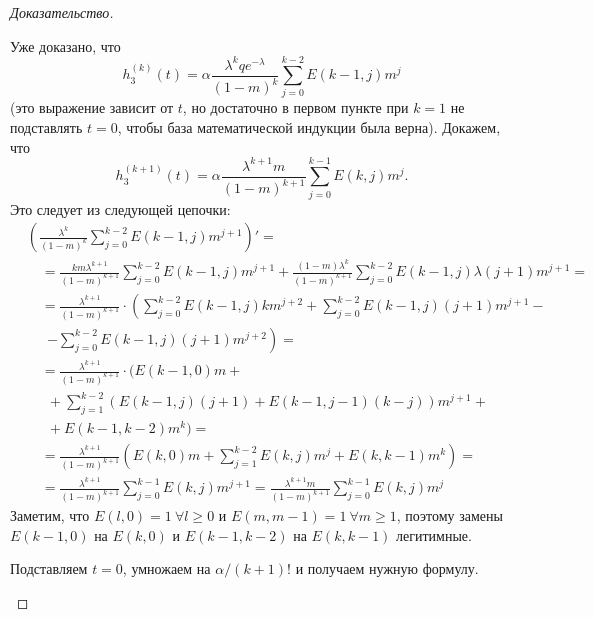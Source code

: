 \documentclass[12pt, specialist, subf, substylefile = spbu_report.rtx]{disser}
\begin{document}
\begin{proof}[Доказательство]
\begin{enumerate}
			Уже доказано, что
			\[
			h _3 ^{(k)} (t) = \alpha \frac {\lambda ^k q e ^{-\lambda}} {(1 - m) ^k} \sum \limits _{j = 0} ^{k - 2} E(k - 1, j) m ^j
			\]
			(это выражение зависит от $t$, но достаточно в первом пункте при $k = 1$ не подставлять $t = 0$, чтобы база математической индукции была верна). Докажем, что
			\[
			h _3 ^{(k + 1)} (t) = \alpha \frac {\lambda ^{k + 1} m} {(1 - m) ^{k + 1}} \sum \limits _{j = 0} ^{k - 1} E(k, j) m ^j.
			\]
			Это следует из следующей цепочки:
			\[
				\begin{aligned}
					&\left(\frac {\lambda ^k} {(1 - m) ^k} \sum \limits _{j = 0} ^{k - 2} E(k - 1, j) m ^{j + 1}\right)' =\\
					&\quad = \frac {km\lambda ^{k + 1}} {(1 - m) ^{k + 1}} \sum \limits _{j = 0} ^{k - 2} E(k - 1, j) m ^{j + 1} + \frac {(1 - m)\lambda ^k} {(1 - m) ^{k + 1}} \sum \limits _{j = 0} ^{k - 2} E(k - 1, j) \lambda (j + 1) m ^{j + 1} =\\
					&\quad = \frac {\lambda ^{k + 1}} {(1 - m) ^{k + 1}} \cdot \left(\sum \limits _{j = 0} ^{k - 2} E(k - 1, j) k m ^{j + 2} + \sum \limits _{j = 0} ^{k - 2} E(k - 1, j) (j + 1) m ^{j + 1} -
					\right.\\
					&\quad~~\left. - \sum \limits _{j = 0} ^{k - 2} E(k - 1, j) (j + 1) m ^{j + 2}\right) =\\
					&\quad = \frac {\lambda ^{k + 1}} {(1 - m) ^{k + 1}} \cdot \Bigg(E(k - 1, 0) m +\\
					&\quad~~ + \sum \limits _{j = 1} ^{k - 2} \left(E(k - 1, j) (j + 1) +E(k - 1, j - 1) (k - j)\right) m ^{j + 1} +\\
					&\quad~~ + E(k - 1, k - 2) m ^k\Bigg) =\\
					&\quad = \frac {\lambda ^{k + 1}} {(1 - m) ^{k + 1}} \left(E(k, 0) m + \sum \limits _{j = 1} ^{k - 2} E(k, j) m ^j + E(k, k - 1) m ^k \right) =\\
					&\quad = \frac {\lambda ^{k + 1}} {(1 - m) ^{k + 1}} \sum \limits _{j = 0} ^{k - 1} E(k, j) m ^{j + 1} = \frac {\lambda ^{k + 1} m} {(1 - m) ^{k + 1}} \sum \limits _{j = 0} ^{k - 1} E(k, j) m ^j
				\end{aligned}
			\]
			Заметим, что $E(l, 0) = 1~ \forall l \geqslant 0$ и $E(m, m - 1) = 1~ \forall m \geqslant 1$, поэтому замены $E(k - 1, 0)$ на $E(k, 0)$ и $E(k - 1, k - 2)$ на $E(k, k - 1)$ легитимные.
			
			Подставляем $t = 0$, умножаем на $\alpha / (k + 1)!$ и получаем нужную формулу.
		\end{enumerate}
	\end{proof}
\end{document}
